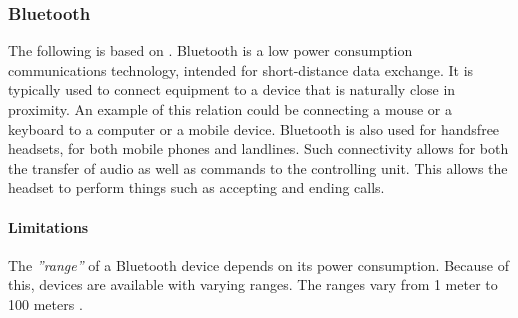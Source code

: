 \subsubsection{Bluetooth}
The following is based on \citet{ieee_bluetooth_standard}.
Bluetooth is a low power consumption communications technology, intended for short-distance data exchange.
It is typically used to connect equipment to a device that is naturally close in proximity.
An example of this relation could be connecting a mouse or a keyboard to a computer or a mobile device.
Bluetooth is also used for handsfree headsets, for both mobile phones and landlines.
Such connectivity allows for both the transfer of audio as well as commands to the controlling unit.
This allows the headset to perform things such as accepting and ending calls.

\paragraph{Limitations}
The \textit{''range''} of a Bluetooth device depends on its power consumption.
Because of this, devices are available with varying ranges.
The ranges vary from 1 meter to 100 meters \cite{bt}.